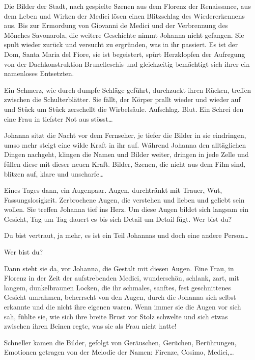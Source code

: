 \documentclass[10pt,titlepage,a5paper]{book}
\begin{document}
Die Bilder der Stadt, nach gespielte Szenen aus dem Florenz der Renaissance, aus dem Leben und Wirken der Medici lösen einen Blitzschlag des Wiedererkennens aus. Bis zur Ermordung von Giovanni de Medici und der Verbrennung des Mönches Savonarola, die weitere Geschichte nimmt Johanna nicht gefangen. Sie spult wieder zurück und versucht zu ergründen, was in ihr passiert. Es ist der Dom, Santa Maria del Fiore, sie ist begeistert, spürt Herzklopfen der Aufregung von der Dachkonstruktion Brunelleschis und gleichzeitig bemächtigt sich ihrer ein namenloses Entsetzten.

 Ein Schmerz, wie durch dumpfe Schläge geführt, durchzuckt ihren Rücken, treffen zwischen die Schulterblätter. Sie fällt, der Körper prallt wieder und wieder auf und Stück um Stück zerschellt die Wirbelsäule. Aufschlag. Blut. Ein Schrei den eine Frau in tiefster Not aus stösst\dots  
 
 Johanna sitzt die Nacht vor dem Fernseher, je tiefer die Bilder in sie eindringen, umso mehr steigt  eine wilde Kraft in ihr auf. Während Johanna den alltäglichen Dingen nachgeht, klingen die Namen und Bilder weiter, dringen in jede Zelle und füllen diese mit dieser neuen Kraft. Bilder, Szenen, die nicht aus dem Film sind, blitzen auf, klare und unscharfe\dots 

Eines Tages dann, ein Augenpaar. Augen, durchtränkt mit Trauer, Wut, Fassungslosigkeit. Zerbrochene Augen, die verstehen und lieben und geliebt sein wollen. Sie treffen Johanna tief ins Herz. Um diese Augen bildet sich langsam ein Gesicht, Tag um Tag dauert es bis sich Detail um Detail fügt.
Wer bist du?

Du bist vertraut, ja mehr, es ist ein Teil Johannas und doch eine andere Person\dots 

Wer bist du?

Dann steht sie da, vor Johanna, die Gestalt mit diesen Augen. 
Eine Frau, in Florenz in der Zeit der aufstrebenden Medici, wunderschön, schlank, zart, mit langem, dunkelbraunen Locken, die ihr schmales, sanftes, fest geschnittenes Gesicht umrahmen, beherrscht von den Augen, durch die Johanna sich selbst erkannte und die nicht ihre eigenen waren. Wenn immer sie die Augen vor sich sah, fühlte sie, wie sich ihre breite Brust vor Stolz schwelte und sich etwas zwischen ihren Beinen regte, was sie als Frau nicht hatte! 

Schneller kamen die Bilder, gefolgt von Geräuschen, Gerüchen, Berührungen, Emotionen getragen von der Melodie der Namen: Firenze, Cosimo, Medici,\dots 
\end{document}
